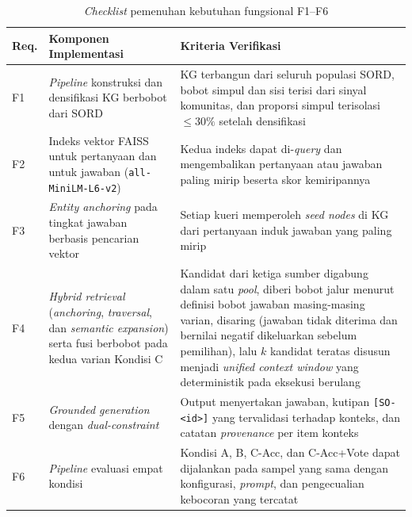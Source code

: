 \begin{table}[!htbp]
\centering
\caption{\emph{Checklist} pemenuhan kebutuhan fungsional F1--F6}
\label{tab:checklist-f1-f6}
\small
\renewcommand{\arraystretch}{1.2}

\begin{tabular}{|p{0.9cm}|>{\raggedright\arraybackslash}p{5.0cm}|>{\raggedright\arraybackslash}p{6.9cm}|}
\hline
\textbf{Req.} &
\textbf{Komponen Implementasi} &
\textbf{Kriteria Verifikasi} \\
\hline

F1 &
\emph{Pipeline} konstruksi dan densifikasi KG berbobot dari SORD &
KG terbangun dari seluruh populasi SORD, bobot simpul dan sisi terisi dari sinyal komunitas, dan proporsi simpul terisolasi $\leq 30\%$ setelah densifikasi \\
\hline

F2 &
Indeks vektor FAISS untuk pertanyaan dan untuk jawaban (\texttt{all-MiniLM-L6-v2}) &
Kedua indeks dapat di-\emph{query} dan mengembalikan pertanyaan atau jawaban paling mirip beserta skor kemiripannya \\
\hline

F3 &
\emph{Entity anchoring} pada tingkat jawaban berbasis pencarian vektor &
Setiap kueri memperoleh \emph{seed nodes} di KG dari pertanyaan induk jawaban yang paling mirip \\
\hline

F4 &
\emph{Hybrid retrieval} (\emph{anchoring}, \emph{traversal}, dan \emph{semantic expansion}) serta fusi berbobot pada kedua varian Kondisi C &
Kandidat dari ketiga sumber digabung dalam satu \emph{pool}, diberi bobot jalur menurut definisi bobot jawaban masing-masing varian, disaring (jawaban tidak diterima dan bernilai negatif dikeluarkan sebelum pemilihan), lalu $k$ kandidat teratas disusun menjadi \emph{unified context window} yang deterministik pada eksekusi berulang \\
\hline

F5 &
\emph{Grounded generation} dengan \emph{dual-constraint} &
Output menyertakan jawaban, kutipan \texttt{[SO-<id>]} yang tervalidasi terhadap konteks, dan catatan \emph{provenance} per item konteks \\
\hline

F6 &
\emph{Pipeline} evaluasi empat kondisi &
Kondisi A, B, C-Acc, dan C-Acc+Vote dapat dijalankan pada sampel yang sama dengan konfigurasi, \emph{prompt}, dan pengecualian kebocoran yang tercatat \\
\hline

\end{tabular}
\end{table}
